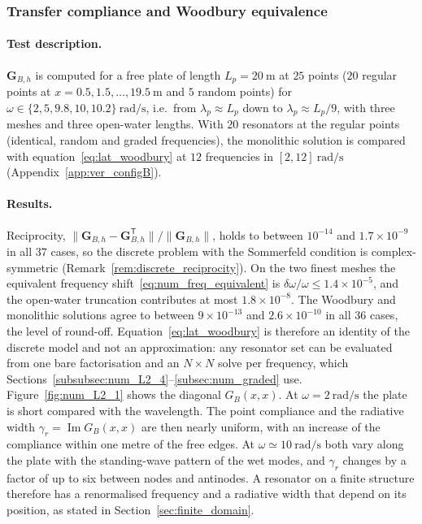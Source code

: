 {\subsubsection{Transfer compliance and Woodbury equivalence}\label{subsubsec:num_L2_1}\label{subsubsec:num_L2_2}

\paragraph{Test description.} $\mathbf{G}_{B,h}$ is computed for a free plate of length $L_p=20~\si{\meter}$ at $25$ points ($20$ regular points at $x=0.5,1.5,\ldots,19.5~\si{\meter}$ and $5$ random points) for $\omega\in\{2,5,9.8,10,10.2\}~\si{\radian\per\second}$, i.e.\ from $\lambda_p\approx L_p$ down to $\lambda_p\approx L_p/9$, with three meshes and three open-water lengths. With $20$ resonators at the regular points (identical, random and graded frequencies), the monolithic solution is compared with equation~\eqref{eq:lat_woodbury} at $12$ frequencies in $[2,12]~\si{\radian\per\second}$ (Appendix~\ref{app:ver_configB}).

\paragraph{Results.} Reciprocity, $\|\mathbf{G}_{B,h}-\mathbf{G}_{B,h}^{\mathsf T}\|/\|\mathbf{G}_{B,h}\|$, holds to between $10^{-14}$ and $1.7\times10^{-9}$ in all $37$ cases, so the discrete problem with the Sommerfeld condition is complex-symmetric (Remark~\ref{rem:discrete_reciprocity}). On the two finest meshes the equivalent frequency shift~\eqref{eq:num_freq_equivalent} is $\delta\omega/\omega\le1.4\times10^{-5}$, and the open-water truncation contributes at most $1.8\times10^{-8}$. The Woodbury and monolithic solutions agree to between $9\times10^{-13}$ and $2.6\times10^{-10}$ in all $36$ cases, the level of round-off. Equation~\eqref{eq:lat_woodbury} is therefore an identity of the discrete model and not an approximation: any resonator set can be evaluated from one bare factorisation and an $N\times N$ solve per frequency, which Sections~\ref{subsubsec:num_L2_4}--\ref{subsec:num_graded} use. Figure~\ref{fig:num_L2_1} shows the diagonal $G_B(x,x)$. At $\omega=2~\si{\radian\per\second}$ the plate is short compared with the wavelength. The point compliance and the radiative width $\gamma_r=\operatorname{Im}G_B(x,x)$ are then nearly uniform, with an increase of the compliance within one metre of the free edges. At $\omega\simeq10~\si{\radian\per\second}$ both vary along the plate with the standing-wave pattern of the wet modes, and $\gamma_r$ changes by a factor of up to six between nodes and antinodes. A resonator on a finite structure therefore has a renormalised frequency and a radiative width that depend on its position, as stated in Section~\ref{sec:finite_domain}.

}
